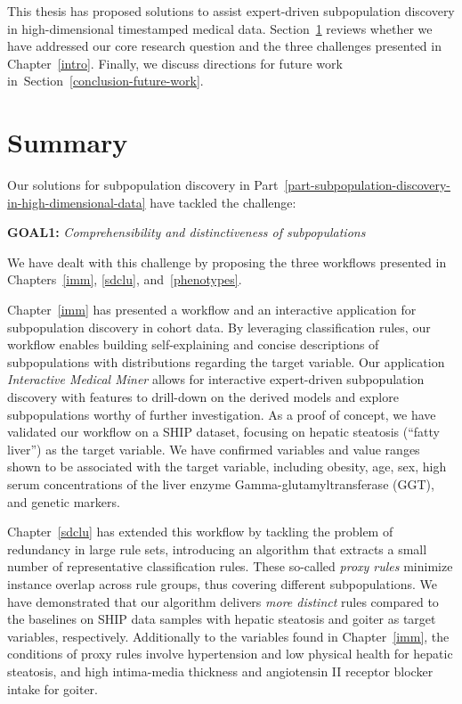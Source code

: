 \documentclass[
  oneside]{book}
\begin{document}
This thesis has proposed solutions to assist expert-driven subpopulation discovery in high-dimensional timestamped medical data.
Section~\ref{conclusion-summary} reviews whether we have addressed our core research question and the three challenges presented in Chapter~\ref{intro}.
Finally, we discuss directions for future work in~Section~\ref{conclusion-future-work}.

\hypertarget{conclusion-summary}{%
\section{Summary}\label{conclusion-summary}}

Our solutions for subpopulation discovery in Part~\ref{part-subpopulation-discovery-in-high-dimensional-data} have tackled the challenge:

\textbf{GOAL1:} \emph{Comprehensibility and distinctiveness of subpopulations}

We have dealt with this challenge by proposing the three workflows presented in Chapters~\ref{imm}, \ref{sdclu}, and~\ref{phenotypes}.

Chapter~\ref{imm} has presented a workflow and an interactive application for subpopulation discovery in cohort data.
By leveraging classification rules, our workflow enables building self-explaining and concise descriptions of subpopulations with distributions regarding the target variable.
Our application \emph{Interactive Medical Miner} allows for interactive expert-driven subpopulation discovery with features to drill-down on the derived models and explore subpopulations worthy of further investigation.
As a proof of concept, we have validated our workflow on a SHIP dataset, focusing on hepatic steatosis (``fatty liver'') as the target variable.
We have confirmed variables and value ranges shown to be associated with the target variable, including obesity, age, sex, high serum concentrations of the liver enzyme Gamma-glutamyltransferase (GGT), and genetic markers.

Chapter~\ref{sdclu} has extended this workflow by tackling the problem of redundancy in large rule sets, introducing an algorithm that extracts a small number of representative classification rules.
These so-called \emph{proxy rules} minimize instance overlap across rule groups, thus covering different subpopulations.
We have demonstrated that our algorithm delivers \emph{more distinct} rules compared to the baselines on SHIP data samples with hepatic steatosis and goiter as target variables, respectively.
Additionally to the variables found in Chapter~\ref{imm}, the conditions of proxy rules involve hypertension and low physical health for hepatic steatosis, and high intima-media thickness and angiotensin II receptor blocker intake for goiter.
\end{document}
